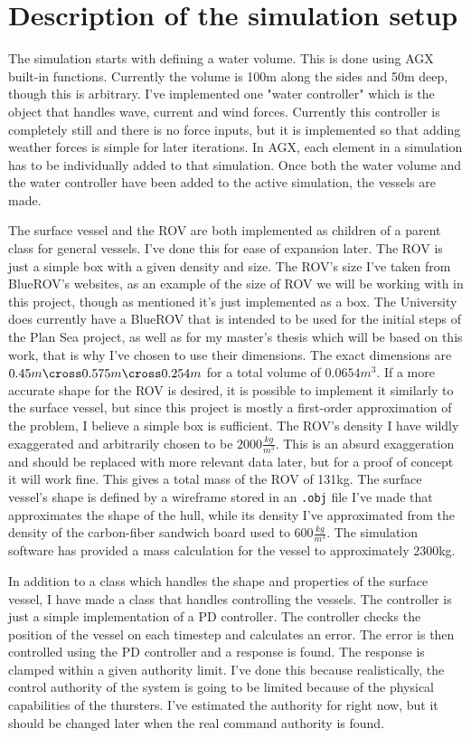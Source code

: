 \section{Description of the simulation setup}
The simulation starts with defining a water volume. This is done using AGX built-in functions. Currently the volume is 100m along the sides and 50m deep, though this is arbitrary. I've implemented one "water controller" which is the object that handles wave, current and wind forces. Currently this controller is completely still and there is no force inputs, but it is implemented so that adding weather forces is simple for later iterations. In AGX, each element in a simulation has to be individually added to that simulation. Once both the water volume and the water controller have been added to the active simulation, the vessels are made.

The surface vessel and the ROV are both implemented as children of a parent class for general vessels. I've done this for ease of expansion later. The ROV is just a simple box with a given density and size. The ROV's size I've taken from BlueROV's websites\cite{noauthor_bluerov2_nodate}, as an example of the size of ROV we will be working with in this project, though as mentioned it's just implemented as a box. The University does currently have a BlueROV that is intended to be used for the initial steps of the Plan Sea project, as well as for my master's thesis which will be based on this work, that is why I've chosen to use their dimensions. The exact dimensions are \(0.45m \cross 0.575m \cross 0.254m\) for a total volume of \(0.0654m^3\). If a more accurate shape for the ROV is desired, it is possible to implement it similarly to the surface vessel, but since this project is mostly a first-order approximation of the problem, I believe a simple box is sufficient. The ROV's density I have wildly exaggerated and arbitrarily chosen to be \(2000\frac{kg}{m^3}\). This is an absurd exaggeration and should be replaced with more relevant data later, but for a proof of concept it will work fine. This gives a total mass of the ROV of 131kg. The surface vessel's shape is defined by a wireframe stored in an \texttt{.obj} file I've made that approximates the shape of the hull, while its density I've approximated from the density of the carbon-fiber sandwich board used to \(600\frac{kg}{m^3}\). The simulation software has provided a mass calculation for the vessel to approximately 2300kg. 

In addition to a class which handles the shape and properties of the surface vessel, I have made a class that handles controlling the vessels. The controller is just a simple implementation of a PD controller. The controller checks the position of the vessel on each timestep and calculates an error. The error is then controlled using the PD controller and a response is found. The response is clamped within a given authority limit. I've done this because realistically, the control authority of the system is going to be limited because of the physical capabilities of the thursters. I've estimated the authority for right now, but it should be changed later when the real command authority is found. 

